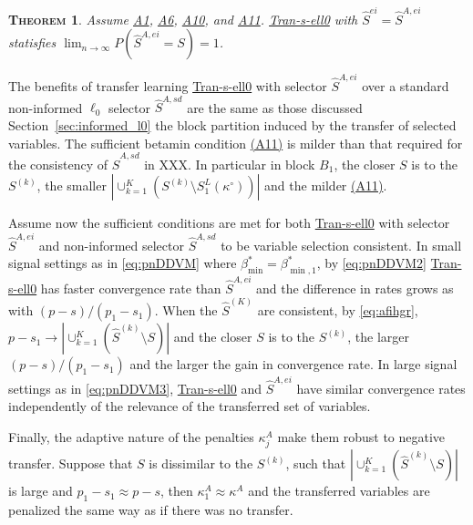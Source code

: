 \documentclass[
  12pt]{article}
\newtheorem{thm}{\textsc{Theorem}}[section]
\begin{document}
\begin{thm}\label{theo:TLconsist}
    Assume \hyperlink{lab:A1}{A1}, \hyperlink{lab:A6}{A6}, \hyperlink{lab:A10}{A10}, and \hyperlink{lab:A11}{A11}. \hyperlink{lab:AlgoTL}{Tran-s-ell0} with $\hat S^{ei}=\hat S^{A,ei}$ statisfies $\lim_{n \to \infty} P(\hat{S}^{A,ei} = S) = 1$.
\end{thm}

The benefits of transfer learning \hyperlink{lab:AlgoTL}{Tran-s-ell0} with selector $\hat S^{A,ei}$ over a standard non-informed $\ell_0$ selector $\hat S^{A,sd}$ are the same as those discussed Section~\ref{sec:informed_l0} the block partition induced by the transfer of selected variables. The sufficient betamin condition \hyperlink{lab:A11}{(A11)} is milder than that required for the consistency of $\hat S^{A,sd}$ in XXX. In particular in block $B_1$, the closer $S$ is to the $S^{(k)}$, the smaller $|\cup_{k=1}^K(S^{(k)}\setminus S_1^L(\kappa^{\circ}))|$ and the milder \hyperlink{lab:A11}{(A11)}. 

Assume now the sufficient conditions are met for both \hyperlink{lab:AlgoTL}{Tran-s-ell0} with selector $\hat S^{A,ei}$ and non-informed selector $\hat S^{A,sd}$ to be variable selection consistent. In small signal settings as in \eqref{eq:pnDDVM} where $\beta_{\min}^*=\beta_{\min,1}^*$, by \eqref{eq:pnDDVM2} \hyperlink{lab:AlgoTL}{Tran-s-ell0} has faster convergence rate than $\hat S^{A,ei}$ and the difference in rates grows as with $(p-s)/(p_1-s_1)$. When the $\hat S^{(K)}$ are consistent, by \eqref{eq:afihgr}, $p-s_1\to |\cup_{k=1}^K(\hat S^{(k)}\setminus S)|$ and the closer $S$ is to the $S^{(k)}$, the larger $(p-s)/(p_1-s_1)$ and the larger the gain in convergence rate. In large signal settings as in \eqref{eq:pnDDVM3}, \hyperlink{lab:AlgoTL}{Tran-s-ell0} and $\hat S^{A,ei}$ have similar convergence rates independently of the relevance of the transferred set of variables.

Finally, the adaptive nature of the penalties $\kappa^{A}_j$ make them robust to negative transfer. Suppose that $S$ is dissimilar to the $S^{(k)}$, such that $|\cup_{k=1}^K(\hat S^{(k)}\setminus S)|$ is large and $p_1-s_1\approx p-s$, then $\kappa^{A}_1 \approx \kappa^{A}$ and the transferred variables are penalized the same way as if there was no transfer. 
\end{document}
